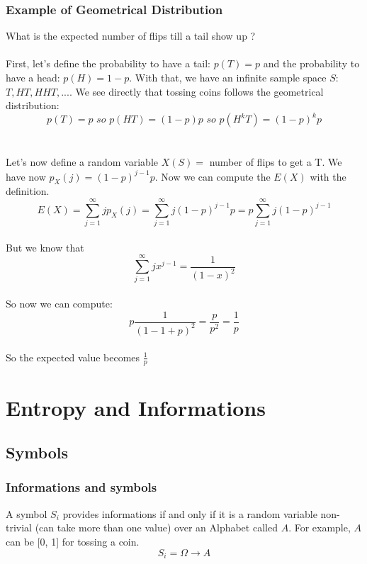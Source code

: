 \documentclass{article}
\begin{document}
\subsubsection{Example of Geometrical Distribution} What is the expected number of flips till a tail show up ?
\\
\\
First, let's define the probability to have a tail: $ p(T) = p $ and the probability to have a head: $ p(H) = 1-p $. With that, we have an infinite sample space $ S: $ {$T, HT, HHT, ...$}. We see directly that tossing coins follows the geometrical distribution:
\begin{equation}
p(T) = p \textit{ so } p(HT) = (1-p)p \textit{ so } p(H^kT) = (1-p)^kp 
\end{equation}
\\
\\
Let's now define a random variable $ X(S) = $ number of flips to get a T. We have now $ p_X(j) = (1-p)^{j-1}p $. Now we can compute the $ E(X) $ with the definition.
\begin{equation}
E(X) = \sum_{j=1}^{\infty}jp_X(j) = \sum_{j=1}^{\infty}j(1-p)^{j-1}p = p\sum_{j=1}^{\infty}j(1-p)^{j-1}
\end{equation}
\\
But we know that
\begin{equation}
\sum_{j=1}^{\infty}jx^{j-1} = \frac{1}{(1-x)^2}
\end{equation}
\\
So now we can compute:
\begin{equation}
p\frac{1}{(1 - 1 + p)^2} = \frac{p}{p^2} = \frac{1}{p}
\end{equation}
\\
So the expected value becomes $ \frac{1}{p} $

\newpage
\section{Entropy and Informations}
\subsection{Symbols}
\subsubsection{Informations and symbols} A symbol $ S_i $ provides informations if and only if it is a random variable non-trivial (can take more than one value) over an Alphabet called $ A $. For example, $ A $ can be [0, 1] for tossing a coin.
\begin{equation}
S_i = \Omega \rightarrow A
\end{equation}
\end{document}
